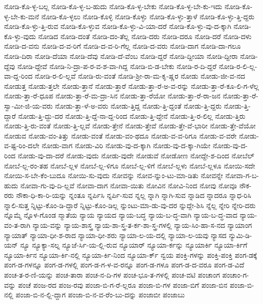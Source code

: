 {ನೋಡಿ-ಕೊ-ಳ್ಳ-ಬಲ್ಲ
ನೋಡಿ-ಕೊ-ಳ್ಳ-ಬ-ಹುದು
ನೋಡಿ-ಕೊ-ಳ್ಳ-ಬೇಕು
ನೋಡಿ-ಕೊ-ಳ್ಳ-ಬೇ-ಕು-ಇದು
ನೋಡಿ-ಕೊ-ಳ್ಳ-ಬೇ-ಕು-ಮನೆ
ನೋಡಿ-ಕೊ-ಳ್ಳಲು
ನೋಡಿ-ಕೊಳ್ಳಿ
ನೋಡಿ-ಕೊಳ್ಳು
ನೋಡಿ-ಕೊ-ಳ್ಳು-ತ್ತಾಳೆ
ನೋಡಿ-ಕೊ-ಳ್ಳು-ತ್ತಿ-ದ್ದರು
ನೋಡಿ-ಕೊ-ಳ್ಳು-ತ್ತಿ-ರುವ
ನೋಡಿ-ಕೊ-ಳ್ಳುವ
ನೋಡಿ-ಕೊ-ಳ್ಳು-ವಿ-ಯಾ-ದರೆ
ನೋಡಿ-ಕೊ-ಳ್ಳು-ವು-ದ-ಕ್ಕಾಗಿ
ನೋಡಿ-ಕೊ-ಳ್ಳು-ವುದು
ನೋಡಿದ
ನೋಡಿ-ದಂತೆ
ನೋಡಿ-ದಂ-ತೆಲ್ಲ
ನೋಡಿ-ದರು
ನೋಡಿ-ದರೂ
ನೋಡಿ-ದರೆ
ನೋಡಿ-ದಳು
ನೋಡಿ-ದ-ವನು
ನೋಡಿ-ದ-ವ-ರಿಗೆ
ನೋಡಿ-ದ-ವ-ರಿ-ಗೆಲ್ಲ
ನೋಡಿ-ದ-ವರು
ನೋಡಿ-ದಾಗ
ನೋಡಿ-ದಾ-ಗಲೂ
ನೋಡಿ-ದಿರಾ
ನೋಡಿ-ದೆಯಾ
ನೋಡಿ-ದೆವು
ನೋಡಿ-ದೆ-ವೆಂಬ
ನೋಡಿ-ದ್ದರೆ
ನೋಡಿ-ದ್ದೀಯಾ
ನೋಡಿ-ದ್ದೀರಾ
ನೋಡಿ-ದ್ದೆವು
ನೋಡಿ-ದ್ದೇವೆ
ನೋಡಿ-ನಿ-ದ್ರಾ-ಪ-ರ-ವ-ಶ-ವಾ-ಗಿದ್ದ
ನೋಡಿ-ಬಿ-ಡ-ಬೇಕು
ನೋಡಿ-ರ-ದಿ-ದ್ದರೆ
ನೋಡಿ-ರ-ಲಿ-ಲ್ಲ-ವಾ-ದ್ದ-ರಿಂದ
ನೋಡಿ-ರ-ಲಿ-ಲ್ಲವೆ
ನೋಡಿ-ರು-ವಂತೆ
ನೋಡಿ-ಶ್ರೀ-ರಾ-ಮ-ಕೃ-ಷ್ಣರ
ನೋಡು
ನೋಡು-ಜೀ-ವ-ನದ
ನೋಡುತ್ತ
ನೋಡು-ತ್ತಲೇ
ನೋಡು-ತ್ತಾನೆ
ನೋಡು-ತ್ತಾರೆ
ನೋಡು-ತ್ತಾ-ರೆ-ಅ-ವ-ರನ್ನು
ನೋಡು-ತ್ತಾ-ರೆ-ಕೂ-ಲಿ-ಗ-ಳೆಲ್ಲ
ನೋಡು-ತ್ತಾ-ರೆ-ಧೂಪ
ನೋಡು-ತ್ತಾ-ರೆ-ಮ-ದ್ರಾ-ಸಿನ
ನೋಡು-ತ್ತಾ-ರೆಯೋ
ನೋಡು-ತ್ತಾ-ರೆ-ರಾ-ಜನ
ನೋಡು-ತ್ತಾ-ರೆ-ಸ್ವಾ-ಮೀ-ಜಿ-ಯ-ವರು
ನೋಡು-ತ್ತಾ-ಳೆ-ಅ-ವರು
ನೋಡು-ತ್ತಿದ್ದ
ನೋಡು-ತ್ತಿ-ದ್ದಂತೆ
ನೋಡು-ತ್ತಿ-ದ್ದರು
ನೋಡು-ತ್ತಿ-ದ್ದಾರೆ
ನೋಡು-ತ್ತಿ-ದ್ದು-ದರ
ನೋಡು-ತ್ತಿ-ದ್ದೆ-ನಾ-ದ್ದ-ರಿಂದ
ನೋಡು-ತ್ತಿ-ದ್ದೇನೆ
ನೋಡು-ತ್ತಿ-ರ-ಲಿಲ್ಲ
ನೋಡು-ತ್ತಿರು
ನೋಡು-ತ್ತಿ-ರು-ವಂತೆ
ನೋಡು-ತ್ತಿ-ಲ್ಲವೆ
ನೋಡು-ತ್ತೇನೆ
ನೋಡು-ತ್ತೇವೆ
ನೋಡು-ತ್ತೇ-ವೆ-ಭಾರೀ
ನೋಡು-ತ್ತೇ-ವೆಯೋ
ನೋಡುವ
ನೋಡು-ವಂ-ತಿತ್ತು
ನೋಡು-ವಂತೆ
ನೋಡು-ವಂ-ಥದೂ
ನೋಡು-ವ-ವ-ರಿಗೂ
ನೋಡು-ವ-ವರೇ
ನೋಡು-ವ-ಷ್ಟ-ರಿಂ-ದಲೇ
ನೋಡು-ವಾಗ
ನೋಡು-ವಿರಿ
ನೋಡು-ವು-ದ-ಕ್ಕಾಗಿ
ನೋಡು-ವು-ದ-ಕ್ಕಾ-ಗಿಯೇ
ನೋಡು-ವು-ದ-ರಿಂದ
ನೋಡು-ವು-ದಾ-ದರೆ
ನೋಡು-ವುದು
ನೋಡು-ವುದೇ
ನೋಡುವೆ
ನೋಡೋಣ
ನೋದ್ದೇ-ಶ-ದಿಂದ
ನೋಬೆಲ್
ನೋಬೆ-ಲ್ಲ-ರಂ-ತಹ
ನೋಬೆ-ಲ್ಲಳ
ನೋಬೆ-ಲ್ಲ-ಳಿಗೂ
ನೋಬೆ-ಲ್ಲ-ಳಿಗೆ
ನೋಬೆ-ಲ್ಲಳು
ನೋಬೆ-ಲ್ಲಳೂ
ನೋಯಿ-ಸದೇ
ನೋಯಿ-ಸ-ಬೇ-ಕೆಂ-ಬುದೂ
ನೋಯಿ-ಸು-ವುದು
ನೋವನ್ನು
ನೋವ-ನ್ನುಂ-ಟು-ಮಾ-ಡಿತು
ನೋವನ್ನೇ
ನೋವಾ-ಗ-ಬ-ಹುದು
ನೋವಾ-ಗು-ವು-ದಿ-ಲ್ಲವೆ
ನೋವಾ-ದಾಗ
ನೋವಾ-ಯಿತು
ನೋವಿನ
ನೋವಿ-ನಿಂದ
ನೋವು
ನೋವೂ
ನೌಕ-ರರು
ನೌಕಾ-ಧಿ-ಕಾ-ರಿ-ಯನ್ನು
ನ್ನಂತೂ
ನ್ನರ್ಪಿಸಿ
ನ್ನರ್ಪಿ-ಸುವ
ನ್ನಲ್ಲ
ನ್ನಾಗಿ
ನ್ನಾಗಿ-ಸುವ
ನ್ನಾಡಿದ
ನ್ನಾದರೂ
ನ್ನಾಧ-ರಿಸಿ
ನ್ನಾಲಿ-ಸುತ್ತ
ನ್ನಿಟ್ಟು-ಕೊಂ-ಡಿ-ದ್ದಾರೆ
ನ್ನಿಟ್ಟು-ಕೊಂ-ಡಿಲ್ಲ
ನ್ನುಂಟು-ಮಾ-ಡು-ವು-ದರ
ನ್ನುದ್ದೇ-ಶಿಸಿ
ನ್ನೆಲ್ಲ
ನ್ನೇರಿ
ನ್ನೇರಿ-ದರು
ನ್ನೊಮ್ಮೆ
ನ್ನೊಳ-ಗೊಂಡ
ನ್ಮಾತೆಯ
ನ್ಯಾಯ
ನ್ಯಾಯದ
ನ್ಯಾಯ-ಬದ್ಧ
ನ್ಯಾಯ-ಬ-ದ್ಧ-ವಾಗಿ
ನ್ಯಾಯ-ಬ-ದ್ಧ-ವಾದ
ನ್ಯಾಯ-ವಂ-ತ-ರಾಗಿ
ನ್ಯಾಯ-ವನ್ನು
ನ್ಯಾಯ-ಶಾಸ್ತ್ರ
ನ್ಯಾಯ-ಶಾ-ಸ್ತ್ರ-ತ-ರ್ಕ-ಶಾ-ಸ್ತ್ರ-ಗಳಲ್ಲಿ
ನ್ಯಾಯ-ಸಿಂ-ಹಾ-ಸ-ನದ
ನ್ಯಾಯಾಂಗ
ನ್ಯಾಯಾತ್
ನ್ಯಾಯಾ-ಧೀ-ಶ-ರಾದ
ನ್ಯಾಯಾ-ಧೀ-ಶರು
ನ್ಯಾಯಾ-ಲ-ಯ-ದಲ್ಲಿ
ನ್ಯಾಯಾ-ಲ-ಯವು
ನ್ಯಾಸದ
ನ್ಯುಮಿ-ಡಿ-ಯನ್
ನ್ಯೂ
ನ್ಯೂಕ್ಯಾ-ಸಲ್ನ
ನ್ಯೂಜೆ-ರ್ಸಿ-ಯ-ಲ್ಲಿ-ರುವ
ನ್ಯೂಯಾರ್
ನ್ಯೂಯಾ-ರ್ಕನ್ನು
ನ್ಯೂಯಾರ್ಕಿ
ನ್ಯೂಯಾ-ರ್ಕಿಗೆ
ನ್ಯೂಯಾ-ರ್ಕಿನ
ನ್ಯೂಯಾ-ರ್ಕಿ-ನಲ್ಲಿ
ನ್ಯೂಯಾ-ರ್ಕಿ-ನಿಂದ
ನ್ಯೂಯಾ-ರ್ಕ್
ನ್ವಯ
ಪಂಕ್ತಿ-ಗಳನ್ನು
ಪಂಕ್ತಿ-ಪಂಕ್ತಿ
ಪಂಗ-ಡಕ್ಕೆ
ಪಂಗ-ಡ-ಗಳನ್ನೂ
ಪಂಗ-ಡ-ಗಳಲ್ಲಿ
ಪಂಗ-ಡ-ಗ-ಳ-ವ-ರನ್ನೂ
ಪಂಗ-ಡ-ಗಳೂ
ಪಂಗ-ಡ-ದ-ವರೂ
ಪಂಗ-ಡ-ವಿದೆ
ಪಂಚ-ತ-ರ-ಣಿ-ಯನ್ನು
ಪಂಚ-ತಾರಾ
ಪಂಚ-ನ-ದಿ-ಗಳ
ಪಂಚ-ಭೂ-ತ-ಗಳಲ್ಲಿ
ಪಂಚ-ವಟಿ
ಪಂಚಾಂಗ
ಪಂಚಾಂ-ಗ-ವನ್ನು
ಪಂಚೆ
ಪಂಜ-ರದ
ಪಂಜ-ರವು
ಪಂಜಾ-ಬಿ-ಗ-ರೆ-ಲ್ಲರೂ
ಪಂಜಾ-ಬಿ-ಗಳ
ಪಂಜಾ-ಬಿಗೆ
ಪಂಜಾ-ಬಿನ
ಪಂಜಾ-ಬಿ-ನಲ್ಲಿ
ಪಂಜಾ-ಬಿ-ನ-ಲ್ಲಿ-ದ್ದಾಗ
ಪಂಜಾ-ಬಿ-ನ-ವ-ರೆಂ-ಬು-ದನ್ನು
ಪಂಜಾಬೀ
ಪಂಜಾಬು
}
